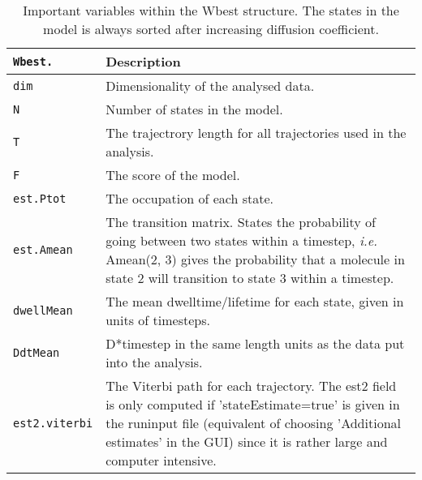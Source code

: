 \begin{table}[ht]
\caption{Important variables within the Wbest structure. The states in the model is always sorted after increasing diffusion coefficient.} 
\centering 
\begin{tabular*}{13.1cm}{ | m{2.7cm} | m{9.5cm} | } 
\hline
\texttt{Wbest.} & \textbf{Description} \\ [0.5ex] 
\hline \hline 
\texttt{dim} 						& Dimensionality of the analysed data.\\[0.5ex]   \hline 
\texttt{N}  						& Number of states in the model.\\[0.5ex]  \hline 
\texttt{T}							& The trajectrory length for all trajectories used in the analysis.\\[0.5ex]  \hline 
\texttt{F}						 	& The score of the model.\\[0.5ex]  \hline 
\texttt{est.Ptot}				& The occupation of each state.\\[0.5ex]  \hline 
\texttt{est.Amean}			& The transition matrix. States the probability of going between two states within a timestep, \textit{i.e.} Amean(2, 3) gives the probability that a molecule in state 2 will transition to state 3 within a timestep.\\[0.5ex]  \hline 
\texttt{dwellMean}			& The mean dwelltime/lifetime for each state, given in units of timesteps.\\[0.5ex]  \hline 
\texttt{DdtMean}				& D*timestep in the same length units as the data put into the analysis.\\[0.5ex]  \hline 
\texttt{est2.viterbi}			& The Viterbi path for each trajectory. The est2 field is only computed if 'stateEstimate=true' is given in the runinput file (equivalent of choosing 'Additional estimates' in the GUI) since it is rather large and computer intensive. \\[1ex] %
\hline 
\end{tabular*}\label{Tab:Wbest} 
\end{table}

\newpage

